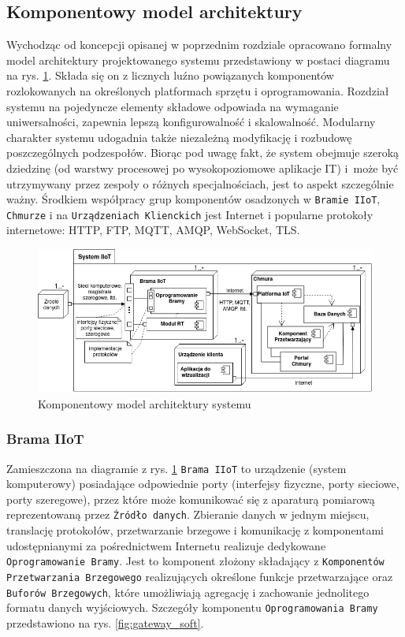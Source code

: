 \documentclass[a4paper, 12pt, twoside]{article}
\begin{document}
\subsection{Komponentowy model architektury}\label{model-komp}

Wychodząc od koncepcji opisanej w poprzednim rozdziale opracowano
formalny model architektury projektowanego systemu przedstawiony
w postaci diagramu na rys. \ref{fig:arch}. Składa się on z licznych luźno
powiązanych komponentów rozlokowanych na określonych platformach sprzętu i oprogramowania.
Rozdział systemu na pojedyncze elementy składowe odpowiada na wymaganie uniwersalności, zapewnia
lepszą konfigurowalność i skalowalność. Modularny charakter systemu
udogadnia także niezależną modyfikację i rozbudowę poszczególnych podzespołów.
Biorąc pod uwagę fakt, że system obejmuje szeroką dziedzinę (od warstwy procesowej
po wysokopoziomowe aplikacje IT) i~może być utrzymywany przez zespoły o różnych
specjalnościach, jest to aspekt szczególnie ważny. Środkiem współpracy
grup komponentów osadzonych w \texttt{Bramie IIoT}, \texttt{Chmurze} i na
\texttt{Urządzeniach Klienckich} jest
Internet i popularne protokoły internetowe: HTTP, FTP, MQTT, AMQP, WebSocket, TLS.

\begin{figure}[h]
      \centering
      \includegraphics[width=\textwidth]{arch.png}
      \caption{Komponentowy model architektury systemu}
      \label{fig:arch}
\end{figure}

\subsubsection{Brama IIoT}\label{brama-iot-general}

Zamieszczona na diagramie z rys. \ref{fig:arch} \texttt{Brama IIoT} to urządzenie (system komputerowy)
posiadające odpowiednie porty (interfejsy fizyczne, porty sieciowe, porty szeregowe),
przez które może komunikować się z aparaturą pomiarową reprezentowaną przez
\texttt{Źródło danych}. Zbieranie danych w jednym miejscu, translację protokołów,
przetwarzanie brzegowe i komunikację z komponentami udostępnianymi za pośrednictwem
Internetu realizuje dedykowane \texttt{Oprogramowanie Bramy}.
Jest to komponent złożony składający z \texttt{Komponentów Przetwarzania Brzegowego}
realizujących określone funkcje przetwarzające oraz \texttt{Buforów Brzegowych},
które umożliwiają agregację i zachowanie jednolitego formatu danych wyjściowych.
Szczegóły komponentu \texttt{Oprogramowania Bramy}
przedstawiono na rys. \ref{fig:gateway_soft}.
\end{document}
